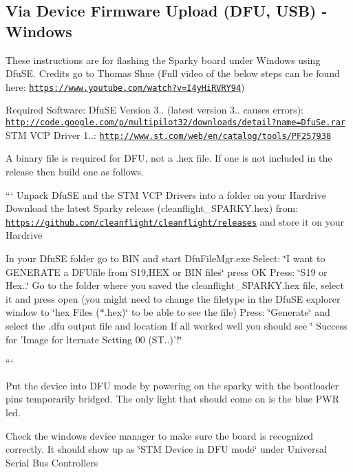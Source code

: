 \subsection*{Via Device Firmware Upload (D\+F\+U, U\+S\+B) -\/ Windows}

These instructions are for flashing the Sparky board under Windows using Dfu\+S\+E. Credits go to Thomas Shue (Full video of the below steps can be found here\+: \href{https://www.youtube.com/watch?v=I4yHiRVRY94}{\tt https\+://www.\+youtube.\+com/watch?v=\+I4y\+Hi\+R\+V\+R\+Y94})

Required Software\+: Dfu\+S\+E Version 3.. (latest version 3.. causes errors)\+: \href{http://code.google.com/p/multipilot32/downloads/detail?name=DfuSe.rar}{\tt http\+://code.\+google.\+com/p/multipilot32/downloads/detail?name=\+Dfu\+Se.\+rar} S\+T\+M V\+C\+P Driver 1..\+: \href{http://www.st.com/web/en/catalog/tools/PF257938}{\tt http\+://www.\+st.\+com/web/en/catalog/tools/\+P\+F257938}

A binary file is required for D\+F\+U, not a .hex file. If one is not included in the release then build one as follows.

``` Unpack Dfu\+S\+E and the S\+T\+M V\+C\+P Drivers into a folder on your Hardrive Download the latest Sparky release (cleanflight\+\_\+\+S\+P\+A\+R\+K\+Y.\+hex) from\+: \href{https://github.com/cleanflight/cleanflight/releases}{\tt https\+://github.\+com/cleanflight/cleanflight/releases} and store it on your Hardrive

In your Dfu\+S\+E folder go to B\+I\+N and start Dfu\+File\+Mgr.\+exe Select\+: \char`\"{}\+I want to G\+E\+N\+E\+R\+A\+T\+E a D\+F\+Ufile from S19,\+H\+E\+X or B\+I\+N files\char`\"{} press O\+K Press\+: \char`\"{}\+S19 or Hex..\char`\"{} Go to the folder where you saved the cleanflight\+\_\+\+S\+P\+A\+R\+K\+Y.\+hex file, select it and press open (you might need to change the filetype in the Dfu\+S\+E explorer window to \char`\"{}hex Files ($\ast$.\+hex)\char`\"{} to be able to see the file) Press\+: \char`\"{}\+Generate\char`\"{} and select the .dfu output file and location If all worked well you should see \char`\"{} Success for '\+Image for lternate Setting 00 (\+S\+T..)'!\char`\"{}

```

Put the device into D\+F\+U mode by powering on the sparky with the bootloader pins temporarily bridged. The only light that should come on is the blue P\+W\+R led.

Check the windows device manager to make sure the board is recognized correctly. It should show up as \char`\"{}\+S\+T\+M Device in D\+F\+U mode\char`\"{} under Universal Serial Bus Controllers

